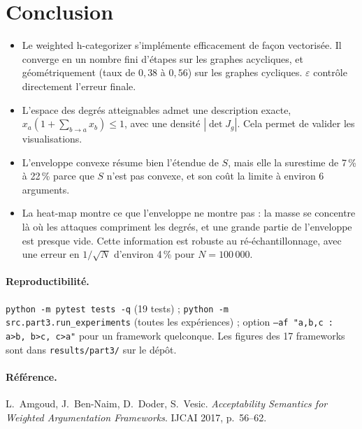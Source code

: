 \documentclass[10pt,a4paper]{article}
\theoremstyle{remark}
\begin{document}
\section{Conclusion}

\begin{itemize}
\item Le weighted h-categorizer s'implémente efficacement de façon vectorisée. Il converge en
un nombre fini d'étapes sur les graphes acycliques, et géométriquement (taux de
$0{,}38$ à $0{,}56$) sur les graphes cycliques. $\varepsilon$ contrôle directement l'erreur finale.
\item L'espace des degrés atteignables admet une description exacte,
$x_a(1+\sum_{b\to a}x_b)\le1$, avec une densité $|\det J_g|$. Cela permet de valider les
visualisations.
\item L'enveloppe convexe résume bien l'étendue de $S$, mais elle la surestime de 7\,\% à
22\,\% parce que $S$ n'est pas convexe, et son coût la limite à environ 6 arguments.
\item La heat-map montre ce que l'enveloppe ne montre pas : la masse se concentre là où les
attaques compriment les degrés, et une grande partie de l'enveloppe est presque vide. Cette
information est robuste au ré-échantillonnage, avec une erreur en $1/\sqrt N$ d'environ
4\,\% pour $N=100\,000$.
\end{itemize}

\paragraph{Reproductibilité.} \texttt{python -m pytest tests -q} (19 tests) ;
\texttt{python -m src.part3.run\_experiments} (toutes les expériences) ; option
\texttt{--af "a,b,c : a>b, b>c, c>a"} pour un framework quelconque. Les figures des 17
frameworks sont dans \texttt{results/part3/} sur le dépôt.

\paragraph{Référence.} L.~Amgoud, J.~Ben-Naim, D.~Doder, S.~Vesic. \emph{Acceptability
Semantics for Weighted Argumentation Frameworks}. IJCAI 2017, p.~56--62.
\end{document}
